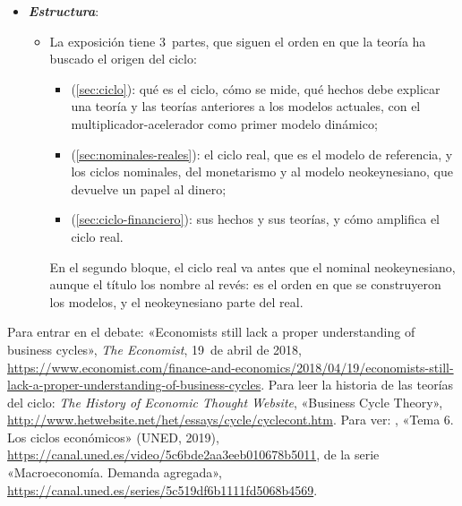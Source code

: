 \documentclass[11pt]{article}
\begin{document}
\begin{itemize}
\item \textbf{\emph{Estructura}}:
  \begin{itemize}
  \item La exposición tiene 3~partes, que siguen el orden en que la teoría ha buscado el origen del ciclo:
  \begin{itemize}
  \item {} (\ref{sec:ciclo}): qué es el ciclo, cómo se mide, qué hechos debe explicar una teoría y las teorías anteriores a los modelos actuales, con el multiplicador-acelerador como primer modelo dinámico;
  \item {} (\ref{sec:nominales-reales}): el ciclo real, que es el modelo de referencia, y los ciclos nominales, del monetarismo y  al modelo neokeynesiano, que devuelve un papel al dinero;
  \item {} (\ref{sec:ciclo-financiero}): sus hechos y sus teorías, y cómo amplifica el ciclo real.
  \end{itemize}
  En el segundo bloque, el ciclo real va antes que el nominal neokeynesiano, aunque el título los nombre al revés: es el orden en que se construyeron los modelos, y el neokeynesiano parte del real.
  \end{itemize}
\end{itemize}

\begin{anotaciones}
Para entrar en el debate: «Economists still lack a proper understanding of business cycles», \emph{The Economist}, 19~de abril de 2018, \url{https://www.economist.com/finance-and-economics/2018/04/19/economists-still-lack-a-proper-understanding-of-business-cycles}. Para leer la historia de las teorías del ciclo: \emph{The History of Economic Thought Website}, «Business Cycle Theory», \url{http://www.hetwebsite.net/het/essays/cycle/cyclecont.htm}. Para ver: , «Tema 6. Los ciclos económicos» (UNED, 2019), \url{https://canal.uned.es/video/5c6bde2aa3eeb010678b5011}, de la serie «Macroeconomía. Demanda agregada», \url{https://canal.uned.es/series/5c519df6b1111fd5068b4569}.
\end{anotaciones}
\end{document}
